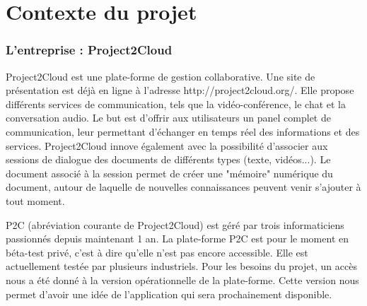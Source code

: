 
	\part{Contexte du projet}
	
	\setcounter{chapter}{1} %
	\setcounter{section}{0} %
	
	\section{L'entreprise : Project2Cloud}
	Project2Cloud est une plate-forme de gestion collaborative. Une site de présentation est déjà en ligne à l'adresse http://project2cloud.org/. Elle propose différents services de communication, tels que la vidéo-conférence, le chat et la conversation audio. Le but est d'offrir aux utilisateurs un panel complet de communication, leur permettant d'échanger en temps réel des informations et des services. Project2Cloud innove également avec la possibilité d'associer aux sessions de dialogue des documents de différents types (texte, vidéos...). Le document associé à la session permet de créer une "mémoire" numérique du document, autour de laquelle de nouvelles connaissances peuvent venir s'ajouter à tout moment.
	
	P2C (abréviation courante de Project2Cloud) est géré par trois informaticiens passionnés depuis maintenant 1 an. La plate-forme P2C est pour le moment en béta-test privé, c'est à dire qu'elle n'est pas encore accessible. Elle est actuellement testée par plusieurs industriels. Pour les besoins du projet, un accès nous a été donné à la version opérationnelle de la plate-forme. Cette version nous permet d'avoir une idée de l'application qui sera prochainement disponible.
	
